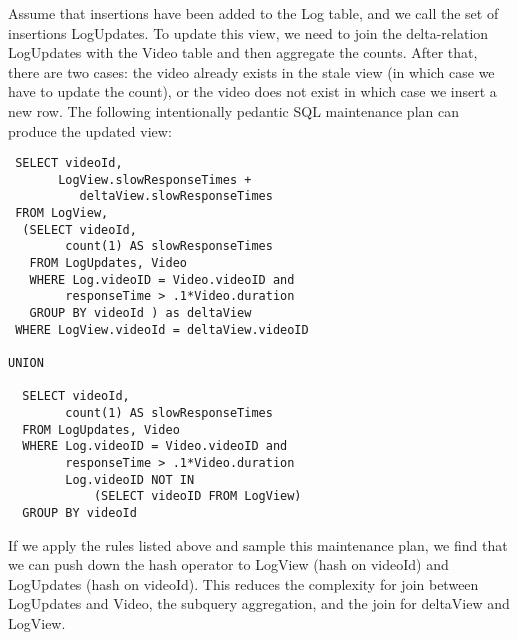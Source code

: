 Assume that insertions have been added to the Log table, and we call the set of insertions LogUpdates.
To update this view, we need to join the delta-relation LogUpdates with the Video table and then aggregate the counts.
After that, there are two cases: the video already exists in the stale view (in which case we have to update the count), or
the video does not exist in which case we insert a new row.
The following intentionally pedantic SQL maintenance plan can produce the updated view:
\begin{lstlisting}
 SELECT videoId, 
       LogView.slowResponseTimes + 
          deltaView.slowResponseTimes
 FROM LogView,
  (SELECT videoId, 
        count(1) AS slowResponseTimes 
   FROM LogUpdates, Video
   WHERE Log.videoID = Video.videoID and
        responseTime > .1*Video.duration
   GROUP BY videoId ) as deltaView
 WHERE LogView.videoId = deltaView.videoID

UNION 

  SELECT videoId, 
        count(1) AS slowResponseTimes 
  FROM LogUpdates, Video
  WHERE Log.videoID = Video.videoID and
        responseTime > .1*Video.duration
        Log.videoID NOT IN 
            (SELECT videoID FROM LogView)
  GROUP BY videoId

\end{lstlisting}
If we apply the rules listed above and sample this maintenance plan, we find that we can push down the hash operator to LogView (hash on videoId) and LogUpdates (hash on videoId). 
This reduces the complexity for join between LogUpdates and Video, the subquery aggregation, and the join for deltaView and LogView.
